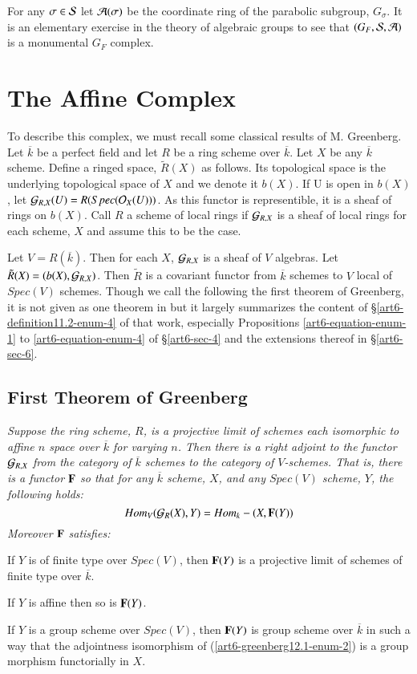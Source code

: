 For any $\sigma \in \mathcal{S}$ let $\mathcal{A}(\sigma)$ be the coordinate ring of the parabolic subgroup, $G_{\sigma}$. It is an elementary exercise in the theory of algebraic groups to see that $(G_{F}, \mathcal{S}, \mathcal{A})$ is a monumental $G_{F}$ complex. 

\section*{The Affine Complex}
To describe this complex, we must recall some classical results of M. Greenberg. Let $\overline{k}$ be a perfect field and let $R$ be a ring scheme over $\overline{k}$. Let $X$ be any $\overline{k}$ scheme. Define a ringed space, $\tilde{R}(X)$ as follows. Its topological space is the underlying topological space of $X$ and we denote it $b(X)$. If U is open in $b(X)$, let $\mathcal{G}_{R, X}(U)= R(Spec(\mathcal{O}_{X}(U)))$. As this functor is representible, it is a sheaf of rings on $b(X)$. Call $R$ a scheme of local rings if $\mathcal{G}_{R, X}$ is a sheaf of local rings for each scheme, $X$ and assume this to be the case. 

Let $V=R(\overline{k})$. Then for each $X$, $\mathcal{G}_{R, X}$ is a sheaf of $V$ algebras. Let $\tilde{R}(X) = (b(X), \mathcal{G}_{R, X})$. Then $\tilde{R}$ is a covariant functor from  $\overline{k}$ schemes to $V$ local of $Spec(V)$ schemes. Though we call the following the first theorem of Greenberg, it is not given as one theorem in \cite{art6-keyMG-I} but it largely summarizes the content of \S\ref{art6-definition11.2-enum-4} of that work, especially Propositions \ref{art6-equation-enum-1} to \ref{art6-equation-enum-4} of \S \ref{art6-sec-4} and the extensions thereof in
\S\ref{art6-sec-6}.

\subsection{First Theorem of Greenberg}\label{art6-subsec-12.1}
\textit{Suppose the ring scheme, $R$, is a projective limit of schemes each isomorphic to affine $n$ space over $\overline{k}$ for varying $n$. Then there is a right adjoint to the functor $\mathcal{G}_{R, X}$ from the category of $\overline{k}$ schemes to the category of $V$-schemes. That is, there is a functor $\mathbf{F}$ so that for any $\overline{k}$ scheme, $X$, and any $Spec(V)$ scheme, $Y$, the following holds:
$$
Hom_{V}(\mathcal{G}_{R}(X), Y) = Hom_{k}-(X, \mathbf{F}(Y))
$$
Moreover $\mathbf{F}$ satisfies:}
\begin{enumerate}[(1)]
{\it
\item If $Y$ is of finite type over $Spec(V)$, then $\mathbf{F}(Y)$ is a projective limit of schemes of finite type over $\overline{k}$.\label{art6-greenberg12.1-enum-1}

\item If $Y$ is affine then so is $\mathbf{F}(Y)$.\label{art6-greenberg12.1-enum-2}

\item If $Y$ is a group scheme over $Spec(V)$, then $\mathbf{F}(Y)$ is group scheme over $\overline{k}$ in such a way that the adjointness isomorphism of (\ref{art6-greenberg12.1-enum-2}) is a group morphism functorially in $X$.\label{art6-greenberg12.1-enum-3}}
\end{enumerate} 


